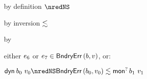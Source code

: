 {\begin{lamportproof*}
    \begin{pfproof}
        \begin{pfproof}
            \begin{pfproof}
              by definition $\nredNS$
            \end{pfproof}
            \begin{pfproof}
              by inversion $\srexpr$
            \end{pfproof}
            \begin{pfproof}
              by \pfih
            \end{pfproof}
          \qedstep
            \begin{pfproof}
              either $\sexpr_6$ or $\sexpr_7 \in \boundaryerror{\sbnd}{\svalue}$, or:
              \begin{mathpar}
              \end{mathpar}
            \end{pfproof}
        \end{pfproof}
        \begin{pfproof}
          \qedstep
            \begin{pfproof}
              $\edyn{\sbnd_0}{\svalue_0} \nredNS \rexpr{\boundaryerror{\sbnd_0}{\svalue_0}}{\emopt{\sbnd_1}{\svalue_1}}$
            \end{pfproof}
        \end{pfproof}
    \end{pfproof}


\end{lamportproof*}}
